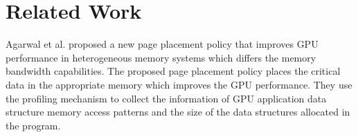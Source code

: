 \documentclass{sig-alternate}
\begin{document}
\section{Related Work}
Agarwal et al. \cite{Agarwal:2015:PPS:2694344.2694381} proposed a new page placement policy that improves GPU performance in heterogeneous memory systems which differs the memory bandwidth capabilities. The proposed page placement policy places the critical data in the appropriate memory which improves the GPU performance. They use the profiling mechanism to collect the information of GPU application data structure memory access patterns and the size of the data structures allocated in the program. 





\end{document}
